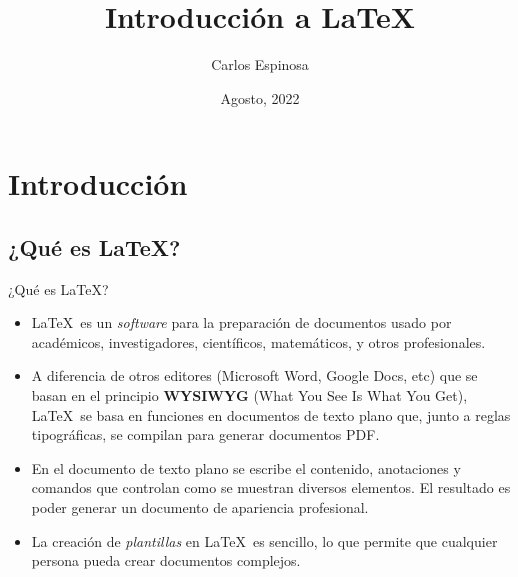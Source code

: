 \documentclass[11pt]{beamer}
\institute{Facultad de Ciencias \\ Universidad Nacional Autónoma de México}
\title{Introducci\'on a \LaTeX}
\author{Carlos Espinosa}
\date{Agosto, 2022}
\begin{document}
	\begin{frame}
		\titlepage
	\end{frame}

	\begin{frame}
		\tableofcontents
	\end{frame}

	\section{Introducción}
	\subsection{¿Qu\'e es \LaTeX?}	

		\begin{frame}{¿Qu\'e es \LaTeX?}
			\begin{itemize}
			\justifying
			\item \LaTeX\ es un \textit{software} para la preparación de documentos 
			usado por académicos, investigadores, científicos, matemáticos, y 
			otros profesionales.

			\item A diferencia de otros editores (Microsoft Word, Google Docs, etc) que 
			se basan en el principio \textbf{WYSIWYG} (What You See Is What You Get), 
			\LaTeX\ se basa en funciones en documentos de texto plano que, junto a reglas 
			tipográficas, se compilan para generar documentos PDF.
			
			\item En el documento de texto plano se escribe el contenido, anotaciones y 
			comandos que controlan como se muestran diversos elementos. El resultado 
			es poder generar un documento de apariencia profesional.

			\item La creación de \textit{plantillas} en \LaTeX\ es sencillo, lo que 
			permite que cualquier persona pueda crear documentos complejos.
			\end{itemize}
		\end{frame}	
\end{document}
